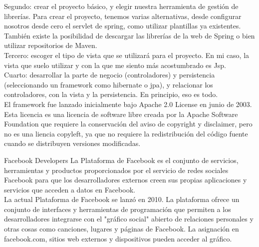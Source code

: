 \begin{itemize}
		Segundo: crear el proyecto básico, y elegir nuestra herramienta de gestión de librerías. Para crear el proyecto, tenemos varias alternativas, desde configurar nosotros desde cero el servlet de spring, como utilizar plantillas ya existentes. También existe la posibilidad de descargar las librerías de la web de Spring o bien utilizar repositorios de Maven.\\
		
		Tercero: escoger el tipo de vista que se utilizará para el proyecto. En mi caso, la vista que suelo utilizar y con la que me siento más acostumbrado es Jsp.\\
		
		Cuarto: desarrollar la parte de negocio (controladores) y persistencia (seleccionando un framework como hibernate o jpa), y relacionar los controladores, con la vista y la persistencia.
		En principio, eso es todo.\\
		El framework fue lanzado inicialmente bajo Apache 2.0 License en junio de 2003. Esta licencia es una licencia de software libre creada por la Apache Software Foundation que requiere la conservación del aviso de copyright y disclaimer, pero no es una liencia copyleft, ya que no requiere la redistribución del código fuente cuando se distribuyen versiones modificadas. \cite{introspring} \\
	\end{itemize}

		\item Facebook Developers 
		La Plataforma de Facebook es el conjunto de servicios, herramientas y productos proporcionados por el servicio de redes sociales Facebook para que los desarrolladores externos creen sus propias aplicaciones y servicios que acceden a datos en Facebook.\\
		
		La actual Plataforma de Facebook se lanzó en 2010. La plataforma ofrece un conjunto de interfaces y herramientas de programación que permiten a los desarrolladores integrarse con el "gráfico social" abierto de relaciones personales y otras cosas como canciones, lugares y páginas de Facebook. La asignación en facebook.com, sitios web externos y dispositivos pueden acceder al gráfico. \\
		

